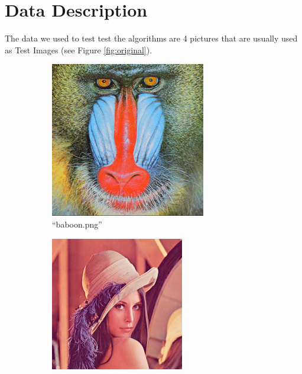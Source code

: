 \documentclass[sigconf,authorversion]{acmart}
\begin{document}
\section{Data Description}
The data we used to test test the algorithms are 4 pictures that are usually used as Test Images (see Figure \ref{fig:original}). 
\begin{figure}[hbtp]
  \begin{subfigure}[b]{0.45\columnwidth}
      \includegraphics[width=\columnwidth]{../imgs/baboon.png}
      \caption{``baboon.png''}
      \label{subfig:baboon}
  \end{subfigure}
  \hspace{0.01\textwidth}
  \begin{subfigure}[b]{0.45\columnwidth}
      \includegraphics[width=\columnwidth]{../imgs/lena.png}

\end{subfigure}
\end{figure}
\end{document}
